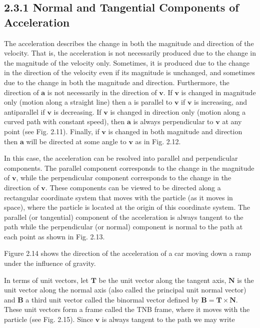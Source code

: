 \documentclass[10pt]{article}
\begin{document}
\subsection*{2.3.1 Normal and Tangential Components of Acceleration}
The acceleration describes the change in both the magnitude and direction of the velocity. That is, the acceleration is not necessarily produced due to the change in the magnitude of the velocity only. Sometimes, it is produced due to the change in the direction of the velocity even if its magnitude is unchanged, and sometimes due to the change in both the magnitude and direction. Furthermore, the direction of $\mathbf{a}$ is not necessarily in the direction of $\mathbf{v}$. If $\mathbf{v}$ is changed in magnitude only (motion along a straight line) then a is parallel to $\mathbf{v}$ if $\mathbf{v}$ is increasing, and antiparallel if $\mathbf{v}$ is decreasing. If $\mathbf{v}$ is changed in direction only (motion along a curved path with constant speed), then $\mathbf{a}$ is always perpendicular to $\mathbf{v}$ at any point (see Fig. 2.11). Finally, if $\mathbf{v}$ is changed in both magnitude and direction then $\mathbf{a}$ will be directed at some angle to $\mathbf{v}$ as in Fig. 2.12.

In this case, the acceleration can be resolved into parallel and perpendicular components. The parallel component corresponds to the change in the magnitude of $\mathbf{v}$, while the perpendicular component corresponds to the change in the direction of $\mathbf{v}$. These components can be viewed to be directed along a rectangular coordinate system that moves with the particle (as it moves in space), where the particle is located at the origin of this coordinate system. The parallel (or tangential) component of the acceleration is always tangent to the path while the perpendicular (or normal) component is normal to the path at each point as shown in Fig. 2.13.

Figure 2.14 shows the direction of the acceleration of a car moving down a ramp under the influence of gravity.

In terms of unit vectors, let $\mathbf{T}$ be the unit vector along the tangent axis, $\mathbf{N}$ is the unit vector along the normal axis (also called the principal unit normal vector) and $\mathbf{B}$ a third unit vector called the binormal vector defined by $\mathbf{B}=\mathbf{T} \times \mathbf{N}$. These unit vectors form a frame called the TNB frame, where it moves with the particle (see Fig. 2.15). Since $\mathbf{v}$ is always tangent to the path we may write
\end{document}
